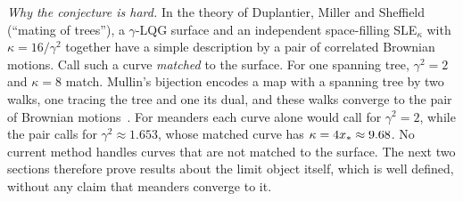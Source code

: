 \emph{Why the conjecture is hard.} In the theory of Duplantier, Miller and Sheffield (``mating
of trees''), a $\gamma$-LQG surface and an independent
space-filling SLE$_\kappa$ with $\kappa=16/\gamma^2$ together have a simple description by a pair
of correlated Brownian motions. Call such a curve \emph{matched} to the surface. For one spanning
tree, $\gamma^2=2$ and $\kappa=8$ match. Mullin's bijection encodes a map with a spanning tree by two
walks, one tracing the tree and one its dual, and these walks converge to the pair of Brownian
motions~\cite{Sheffield,DMS}. For meanders each curve alone would call for $\gamma^2=2$, while the
pair calls for $\gamma^2\approx1.653$, whose matched curve has $\kappa=4x_*\approx9.68$. No current
method handles curves that are not matched to the surface. The
next two sections therefore prove results about the limit object itself, which is well defined,
without any claim that meanders converge to it.

